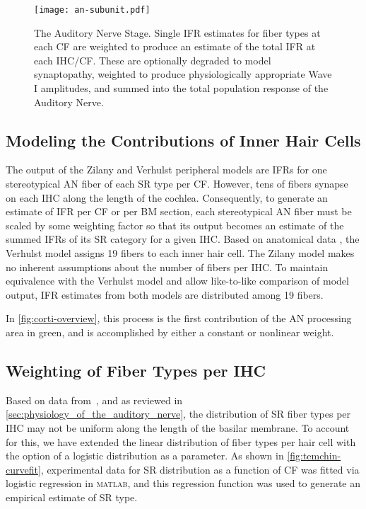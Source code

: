 \begin{figure}[htbp]
	\centering
	\texttt{[image: an-subunit.pdf]}
	\caption[The Auditory Nerve Stage]{The Auditory Nerve Stage. Single IFR estimates for fiber types at each CF are weighted to produce an estimate of the total IFR at each IHC/CF. These are optionally degraded to model synaptopathy, weighted to produce physiologically appropriate Wave I amplitudes, and summed into the total population response of the Auditory Nerve.}
	\label{fig:an-subunit}
\end{figure}

\subsection{Modeling the Contributions of Inner Hair Cells} %
\label{sub:contributions_to_the_response_by_inner_hair_cells}
The output of the Zilany and Verhulst peripheral models are IFRs for one stereotypical AN fiber of each SR type per CF.   However, tens of fibers synapse on each IHC along the length of the cochlea.  Consequently, to generate an estimate of IFR per CF or per BM section, each stereotypical AN fiber must be scaled by some weighting factor so that its output becomes an estimate of the summed IFRs of its SR category for a given IHC.  Based on anatomical data \citep{Liberman1978AuditoryNerve}, the Verhulst model assigns 19 fibers to each inner hair cell.  The Zilany model makes no inherent assumptions about the number of fibers per IHC. To maintain equivalence with the Verhulst model and allow like-to-like comparison of model output, IFR estimates from both models are distributed among 19 fibers.

In \autoref{fig:corti-overview}, this process is the first contribution of the AN processing area in green, and is accomplished by either a constant or nonlinear weight.



\subsection{Weighting of Fiber Types per IHC} %
\label{sub:weighting_of_fiber_types_per_ihc}
Based on data from~\cite{Temchin2008Threshold}, and as reviewed in \autoref{sec:physiology_of_the_auditory_nerve}, the distribution of SR fiber types per IHC may not be uniform along the length of the basilar membrane.  To account for this, we have extended the linear distribution of fiber types per hair cell with the option of a logistic distribution as a parameter.   As shown in \autoref{fig:temchin-curvefit}, experimental data for SR distribution as a function of CF was fitted via logistic regression in \textsc{matlab}, and this regression function was used to generate an empirical estimate of SR type. 

